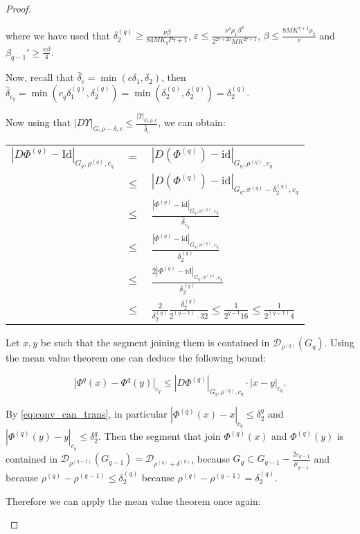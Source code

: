 \begin{proof}
\begin{enumerate}
where we have used that $\delta_2^{(q)}\geq \frac{\nu \beta}{84 M K_qP {\tau+1}}$, $\varepsilon \leq \frac{\nu^3 \rho_1 \beta^2}{2^{2\tau+20}M K^{2\tau+1}}$, $\beta \leq \frac{8M K^{\tau+1}\rho_2}{\nu}$ and $\beta_{q-1}' \geq \frac{\nu \beta}{4}$.


Now, recall that $\hat\delta_c = \min(c\delta_1, \delta_2)$, then $\hat{\delta}_{c_q} = \min(c_q \delta_1^{(q)}, \delta_2^{(q)}) = \min(\delta_2^{(q)},\delta_2^{(q)}) = \delta_2^{(q)}$.

Now using that $|D \Upsilon|_{G,\rho-\delta,c} \leq \frac{|\Upsilon|_{G,\rho,c}}{\hat\delta_c}$, we can obtain:

\begin{longtable}{rcl}
$|D\Phi^{(q)} - \text{Id}|_{G_q,\rho^{(q)}, c_q}$ & $=$ & $|D(\Phi^{(q)}) - \text{id}|_{G_q, \rho^{(q)}, c_q}$ \\
 & $\leq$ & $|D(\Phi^{(q)}) - \text{id}|_{G_q, \sigma^{(q)} - \delta_2^{(q)}, c_q}$ \\
 & $\leq$ & $\frac{|\Phi^{(q)}-\text{id}|_{G_q,\sigma^{(q)},c_q}}{\hat\delta_{c_q}}$ \\
 & $\leq$ & $\frac{|\Phi^{(q)}-\text{id}|_{G_q,\sigma^{(q)},c_q}}{\delta^{(q)}_{2}}$ \\
 & $\leq$ & $\frac{2 |\Phi^{(q)} - \text{id}|_{G_q,\sigma^{(q)},c_q}}{\delta_2^{(q)}}$ \\
 & $\leq$ & $\frac{2}{\delta_2^{(q)}}\frac{\delta_2^{(q)}}{2^{(q-1)}\cdot 32} \leq \frac{1}{2^{q-1}16} \leq \frac{1}{2^{(q-1)}4}$ \\
\end{longtable}

Let $x,y$ be such that the segment joining them is contained in $\mathcal{D}_{\rho^{(q)}}(G_q)$. Using the mean value theorem one can deduce the following bound:

$$|\Phi^{q}(x) - \Phi^{q}(y)|_{c_q} \leq |D \Phi^{(q)}|_{G_q,\rho^{(q)}, c_q}\cdot|x-y|_{c_q}.$$

By \ref{eq:conv_can_trans}, in particular $|\Phi^{(q)}(x)-x|_{c_q} \leq \delta_2^{q}$ and $|\Phi^{(q)}(y)-y|_{c_q} \leq \delta_2^{q}$. Then the segment that join $\Phi^{(q)}(x)$ and $\Phi^{(q)}(y)$ is contained in $\mathcal{D}_{\rho^{(q-1)}}(G_{q-1}) = \mathcal{D}_{\rho^{(q)}+\delta^{(q)}}$, because $G_q \subset G_{q-1} - \frac{2 \varepsilon_{q-1}}{\mu_{q-1}}$ and because $\rho^{(q)}-\rho^{(q-1)} \leq \delta_2^{(q)}$ because $\rho^{(q)}-\rho^{(q-1)} = \delta_2^{(q)}$.

Therefore we can apply the mean value theorem once again:


\end{enumerate}
\end{proof}
